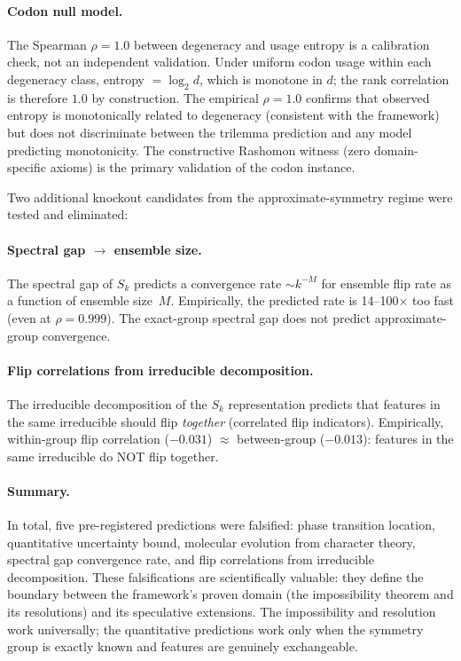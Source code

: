 \documentclass[11pt,a4paper]{article}
\begin{document}
\paragraph{Codon null model.}
The Spearman $\rho = 1.0$ between degeneracy and usage entropy is a calibration check, not an independent validation. Under uniform codon usage within each degeneracy class, entropy $= \log_2 d$, which is monotone in $d$; the rank correlation is therefore $1.0$ by construction. The empirical $\rho = 1.0$ confirms that observed entropy is monotonically related to degeneracy (consistent with the framework) but does not discriminate between the trilemma prediction and any model predicting monotonicity. The constructive Rashomon witness (zero domain-specific axioms) is the primary validation of the codon instance.

Two additional knockout candidates from the approximate-symmetry regime were
tested and eliminated:

\paragraph{Spectral gap $\to$ ensemble size.}
The spectral gap of $S_k$ predicts a convergence rate $\sim k^{-M}$ for
ensemble flip rate as a function of ensemble size~$M$.  Empirically, the
predicted rate is 14--100$\times$ too fast (even at $\rho = 0.999$).  The
exact-group spectral gap does not predict approximate-group convergence.

\paragraph{Flip correlations from irreducible decomposition.}
The irreducible decomposition of the $S_k$ representation predicts that
features in the same irreducible should flip \emph{together} (correlated
flip indicators).  Empirically, within-group flip correlation ($-0.031$)
$\approx$ between-group ($-0.013$): features in the same irreducible do NOT
flip together.

\paragraph{Summary.}
In total, five pre-registered predictions were falsified: phase transition
location, quantitative uncertainty bound, molecular evolution from character
theory, spectral gap convergence rate, and flip correlations from irreducible
decomposition.  These falsifications are scientifically valuable: they define
the boundary between the framework's proven domain (the impossibility theorem
and its resolutions) and its speculative extensions.  The impossibility and
resolution work universally; the quantitative predictions work only when the
symmetry group is exactly known and features are genuinely exchangeable.
\end{document}
